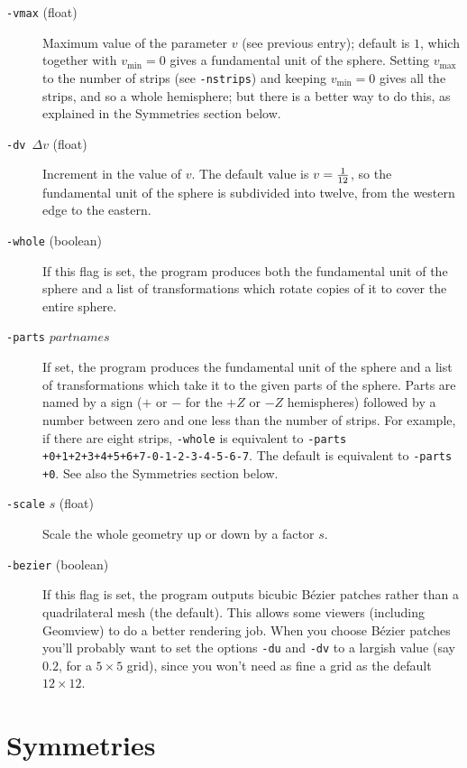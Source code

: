 \begin{description}
\item[{\tt-vmax} (float)]
Maximum value of the parameter $v$ (see previous entry); default is $1$, which together with $v_{\min}=0$ gives a fundamental unit of the
sphere. Setting $v_{\max}$ to the number of strips (see {\tt-nstrips}) and keeping $v_{\min}=0$ gives all the strips, and so a whole
hemisphere; but there is a better way to do this, as explained in the Symmetries section below.

\item[{\tt-dv} $\,\Delta v$ (float)]
Increment in the value of $v$. The default value is $v={1\over12}$, so the fundamental unit of the sphere is subdivided into twelve, from the western edge to the eastern.

\item[{\tt-whole} (boolean)]
If this flag is set, the program produces both the fundamental unit of the sphere and a list of transformations which rotate copies of it to cover the entire sphere.

\item[{\tt-parts} $partnames$]
If set, the program produces the fundamental unit of the sphere and a list of transformations which take it to the given parts of the sphere.
Parts are named by a sign ($+$ or $-$ for the $+Z$ or $-Z$ hemispheres) followed by a number between zero and one less than the number of strips.
For example, if there are eight strips, {\tt -whole} is equivalent to {\tt -parts +0+1+2+3+4+5+6+7-0-1-2-3-4-5-6-7}. The default is equivalent to
{\tt -parts +0}. See also the Symmetries section below.

\item[{\tt-scale} $s$ (float)]
Scale the whole geometry up or down by a factor $s$.

\item[{\tt-bezier} (boolean)]
If this flag is set, the program outputs bicubic B\'ezier patches rather than a quadrilateral mesh (the default). This allows some viewers
(including Geomview) to do a better rendering job. When you choose B\'ezier patches you'll probably want to set the options {\tt-du} and
{\tt-dv} to a largish value (say $0.2$, for a $5\times5$ grid), since you won't need as fine a grid as the default $12\times 12$.
\end{description}

\section*{Symmetries}

